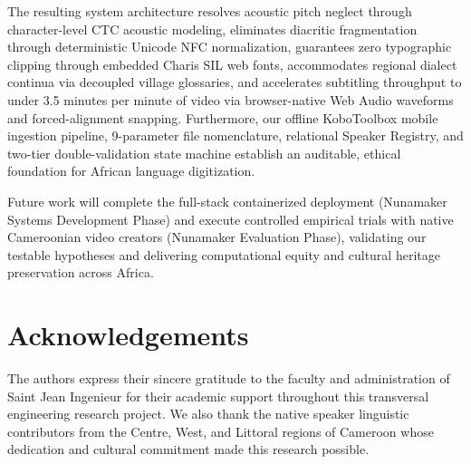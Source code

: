 \documentclass[conference]{IEEEtran}
\begin{document}
The resulting system architecture resolves acoustic pitch neglect through character-level CTC acoustic modeling, eliminates diacritic fragmentation through deterministic Unicode NFC normalization, guarantees zero typographic clipping through embedded Charis SIL web fonts, accommodates regional dialect continua via decoupled village glossaries, and accelerates subtitling throughput to under 3.5 minutes per minute of video via browser-native Web Audio waveforms and forced-alignment snapping. Furthermore, our offline KoboToolbox mobile ingestion pipeline, 9-parameter file nomenclature, relational Speaker Registry, and two-tier double-validation state machine establish an auditable, ethical foundation for African language digitization.

Future work will complete the full-stack containerized deployment (Nunamaker Systems Development Phase) and execute controlled empirical trials with native Cameroonian video creators (Nunamaker Evaluation Phase), validating our testable hypotheses and delivering computational equity and cultural heritage preservation across Africa.

\section*{Acknowledgements}
The authors express their sincere gratitude to the faculty and administration of Saint Jean Ingenieur for their academic support throughout this transversal engineering research project. We also thank the native speaker linguistic contributors from the Centre, West, and Littoral regions of Cameroon whose dedication and cultural commitment made this research possible.

\printbibliography
\end{document}
